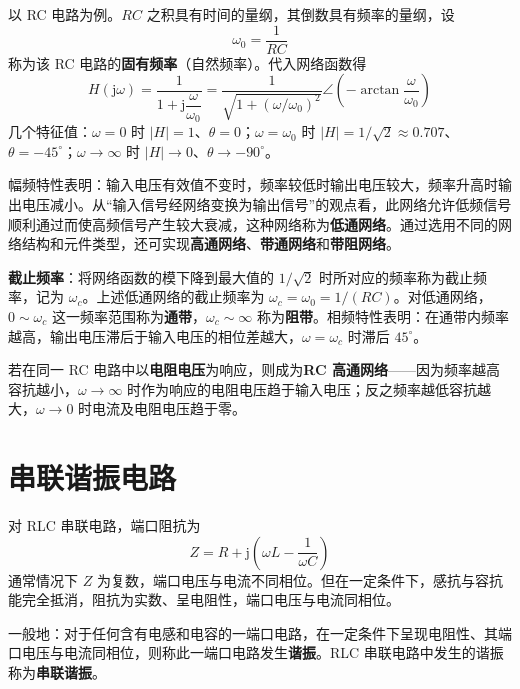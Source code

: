 以 RC 电路为例。$RC$ 之积具有时间的量纲，其倒数具有频率的量纲，设
\begin{equation}
\omega_0=\frac{1}{RC}
\end{equation}
称为该 RC 电路的\textbf{固有频率}（自然频率）。代入网络函数得
\begin{equation}
H(\mathrm{j}\omega)=\frac{1}{1+\mathrm{j}\dfrac{\omega}{\omega_0}}
=\frac{1}{\sqrt{1+\left(\omega/\omega_0\right)^2}}\angle\left(-\arctan\frac{\omega}{\omega_0}\right)
\end{equation}
几个特征值：$\omega=0$ 时 $|H|=1$、$\theta=0$；$\omega=\omega_0$ 时 $|H|=1/\sqrt{2}\approx0.707$、$\theta=-45^\circ$；$\omega\to\infty$ 时 $|H|\to0$、$\theta\to-90^\circ$。

幅频特性表明：输入电压有效值不变时，频率较低时输出电压较大，频率升高时输出电压减小。从“输入信号经网络变换为输出信号”的观点看，此网络允许低频信号顺利通过而使高频信号产生较大衰减，这种网络称为\textbf{低通网络}。通过选用不同的网络结构和元件类型，还可实现\textbf{高通网络}、\textbf{带通网络}和\textbf{带阻网络}。

\textbf{截止频率}：将网络函数的模下降到最大值的 $1/\sqrt{2}$ 时所对应的频率称为截止频率，记为 $\omega_c$。上述低通网络的截止频率为 $\omega_c=\omega_0=1/(RC)$。对低通网络，$0\sim\omega_c$ 这一频率范围称为\textbf{通带}，$\omega_c\sim\infty$ 称为\textbf{阻带}。相频特性表明：在通带内频率越高，输出电压滞后于输入电压的相位差越大，$\omega=\omega_c$ 时滞后 $45^\circ$。

若在同一 RC 电路中以\textbf{电阻电压}为响应，则成为\textbf{RC 高通网络}——因为频率越高容抗越小，$\omega\to\infty$ 时作为响应的电阻电压趋于输入电压；反之频率越低容抗越大，$\omega\to0$ 时电流及电阻电压趋于零。


\section{串联谐振电路}
对 RLC 串联电路，端口阻抗为
\begin{equation}
Z=R+\mathrm{j}\left(\omega L-\frac{1}{\omega C}\right)
\end{equation}
通常情况下 $Z$ 为复数，端口电压与电流不同相位。但在一定条件下，感抗与容抗能完全抵消，阻抗为实数、呈电阻性，端口电压与电流同相位。

一般地：对于任何含有电感和电容的一端口电路，在一定条件下呈现电阻性、其端口电压与电流同相位，则称此一端口电路发生\textbf{谐振}。RLC 串联电路中发生的谐振称为\textbf{串联谐振}。

